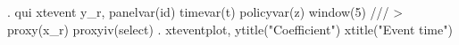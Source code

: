 . qui xtevent y_r, panelvar(id) timevar(t) policyvar(z) window(5) ///
>         proxy(x_r) proxyiv(select)
{\smallskip}
. xteventplot, ytitle("Coefficient") xtitle("Event time")
